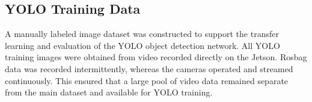 \documentclass{erauthesis}
\begin{document}


\subsection{YOLO Training Data} \label{sec:yolo_training_data}

A manually labeled image dataset was constructed to support the transfer learning and evaluation of the YOLO object detection network. 
All YOLO training images were obtained from video recorded directly on the Jetson.
Rosbag data was recorded intermittently, whereas the cameras operated and streamed continuously.
This ensured that a large pool of video data remained separate from the main dataset and available for YOLO training.
\end{document}
